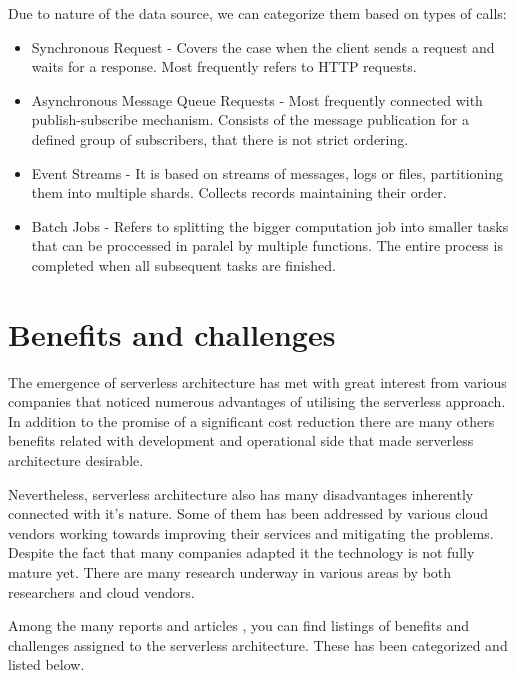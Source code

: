 Due to nature of the data source, we can categorize them based on types of calls:

\begin{itemize}
    \item Synchronous Request - Covers the case when the client sends a request and waits for a response. Most frequently refers to HTTP requests.
    \item Asynchronous Message Queue Requests - Most frequently connected with publish-subscribe mechanism. Consists of the message publication for a defined group of subscribers, that there is not strict ordering. 
    \item Event Streams - It is based on streams of messages, logs or files, partitioning them into multiple shards. Collects records maintaining their order.
    \item Batch Jobs - Refers to splitting the bigger computation job into smaller tasks that can be proccessed in paralel by multiple functions. The entire process is completed when all subsequent tasks are finished.
\end{itemize}

\section{Benefits and challenges}

The emergence of serverless architecture has met with great interest from various companies that noticed numerous advantages of utilising the serverless approach. In addition to the promise of a significant cost reduction there are many others benefits related with development and operational side that made serverless architecture desirable. 

Nevertheless, serverless architecture also has many disadvantages inherently connected with it's nature. Some of them has been addressed by various cloud vendors working towards improving their services and mitigating the problems. Despite the fact that many companies adapted it the technology is not fully mature yet. There are many research underway in various areas by both researchers and cloud vendors.

Among the many reports and articles \cite{MartinFowler}\cite{Berkeley2019}, you can find listings of benefits and challenges assigned to the serverless architecture. These has been categorized and listed below.


